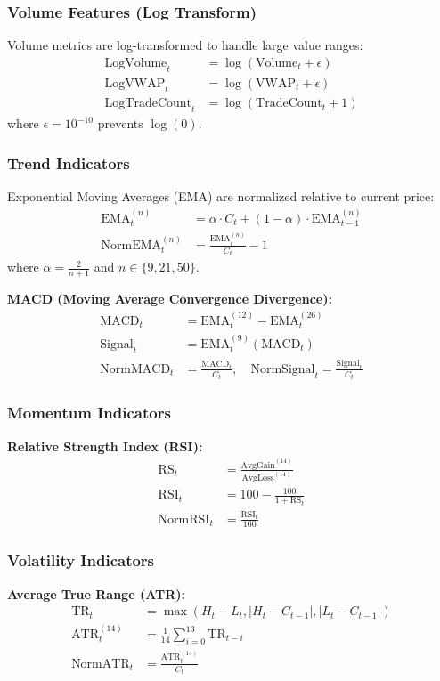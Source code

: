 \documentclass[12pt,a4paper]{article}
\begin{document}
\subsubsection{Volume Features (Log Transform)}
Volume metrics are log-transformed to handle large value ranges:
\begin{align}
    \text{LogVolume}_t &= \log(\text{Volume}_t + \epsilon) \\
    \text{LogVWAP}_t &= \log(\text{VWAP}_t + \epsilon) \\
    \text{LogTradeCount}_t &= \log(\text{TradeCount}_t + 1)
\end{align}
where $\epsilon = 10^{-10}$ prevents $\log(0)$.

\subsubsection{Trend Indicators}
Exponential Moving Averages (EMA) are normalized relative to current price:
\begin{align}
    \text{EMA}_t^{(n)} &= \alpha \cdot C_t + (1-\alpha) \cdot \text{EMA}_{t-1}^{(n)} \\
    \text{NormEMA}_t^{(n)} &= \frac{\text{EMA}_t^{(n)}}{C_t} - 1
\end{align}
where $\alpha = \frac{2}{n+1}$ and $n \in \{9, 21, 50\}$.

\textbf{MACD (Moving Average Convergence Divergence):}
\begin{align}
    \text{MACD}_t &= \text{EMA}_t^{(12)} - \text{EMA}_t^{(26)} \\
    \text{Signal}_t &= \text{EMA}_t^{(9)}(\text{MACD}_t) \\
    \text{NormMACD}_t &= \frac{\text{MACD}_t}{C_t}, \quad \text{NormSignal}_t = \frac{\text{Signal}_t}{C_t}
\end{align}

\subsubsection{Momentum Indicators}
\textbf{Relative Strength Index (RSI):}
\begin{align}
    \text{RS}_t &= \frac{\text{AvgGain}^{(14)}}{\text{AvgLoss}^{(14)}} \\
    \text{RSI}_t &= 100 - \frac{100}{1 + \text{RS}_t} \\
    \text{NormRSI}_t &= \frac{\text{RSI}_t}{100}
\end{align}

\subsubsection{Volatility Indicators}
\textbf{Average True Range (ATR):}
\begin{align}
    \text{TR}_t &= \max(H_t - L_t, |H_t - C_{t-1}|, |L_t - C_{t-1}|) \\
    \text{ATR}_t^{(14)} &= \frac{1}{14}\sum_{i=0}^{13} \text{TR}_{t-i} \\
    \text{NormATR}_t &= \frac{\text{ATR}_t^{(14)}}{C_t}
\end{align}
\end{document}
